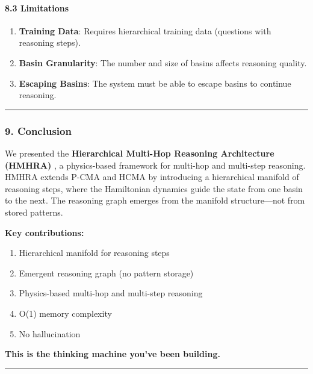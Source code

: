 \documentclass[
  11pt,
  a4paper,
]{article}
\providecommand{\tightlist}{%
  \setlength{\itemsep}{0pt}\setlength{\parskip}{0pt}}
\begin{document}
\paragraph{8.3 Limitations}\label{limitations-3}

\begin{enumerate}
\def\labelenumi{\arabic{enumi}.}
\tightlist
\item
  \textbf{Training Data}: Requires hierarchical training data (questions
  with reasoning steps).
\item
  \textbf{Basin Granularity}: The number and size of basins affects
  reasoning quality.
\item
  \textbf{Escaping Basins}: The system must be able to escape basins to
  continue reasoning.
\end{enumerate}

\begin{center}\rule{0.5\linewidth}{0.5pt}\end{center}

\subsubsection{9. Conclusion}\label{conclusion-4}

We presented the \textbf{Hierarchical Multi-Hop Reasoning Architecture
(HMHRA)} , a physics-based framework for multi-hop and multi-step
reasoning. HMHRA extends P-CMA and HCMA by introducing a hierarchical
manifold of reasoning steps, where the Hamiltonian dynamics guide the
state from one basin to the next. The reasoning graph emerges from the
manifold structure---not from stored patterns.

\textbf{Key contributions:}

\begin{enumerate}
\def\labelenumi{\arabic{enumi}.}
\tightlist
\item
  Hierarchical manifold for reasoning steps
\item
  Emergent reasoning graph (no pattern storage)
\item
  Physics-based multi-hop and multi-step reasoning
\item
  O(1) memory complexity
\item
  No hallucination
\end{enumerate}

\textbf{This is the thinking machine you've been building.}

\begin{center}\rule{0.5\linewidth}{0.5pt}\end{center}
\end{document}
